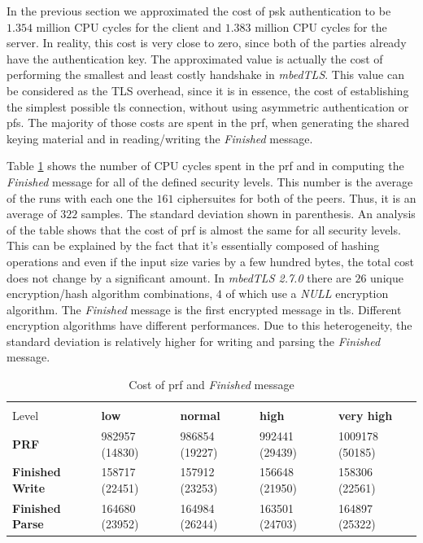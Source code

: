 In the previous section we approximated the cost of \gls{psk} authentication to be $1.354$ million CPU cycles
for the client and $1.383$ million CPU cycles for the server. In reality, this cost is very close to zero, since
both of the parties already have the authentication key. The approximated value is actually the cost of performing the
smallest and least costly handshake in \textit{mbedTLS}.
This value can be considered as the TLS overhead, since it is in essence, the cost of establishing the simplest possible \gls{tls} connection,
without using asymmetric authentication or \gls{pfs}. The majority of those costs are spent in the \gls{prf}, when generating the
shared keying material and in reading/writing the \textit{Finished} message. 

Table \ref{table:hs-key-gen-cost} shows the number of CPU cycles spent in the \gls{prf}
and in computing the \textit{Finished} message for all of the defined security levels.
This number is the average of the runs with each one the $161$ ciphersuites for both of the peers. Thus, it is
an average of $322$ samples. The standard deviation shown in parenthesis.
An analysis of the table shows that the cost of \gls{prf} is almost the same for all security levels. This can be explained by
the fact that it's essentially composed of hashing operations and even if the input size varies
by a few hundred bytes, the total cost does not change by a significant amount.
In \textit{mbedTLS 2.7.0} there are $26$ unique encryption/hash algorithm combinations, $4$ of which use a \textit{NULL} encryption algorithm.
The \textit{Finished} message is the first encrypted message in \gls{tls}. Different encryption algorithms have different
performances. Due to this heterogeneity, the standard deviation is relatively higher for writing and parsing the 
\textit{Finished} message.

\begin{table}[]
\begin{tabular}{|l|l|l|l|l|}
\hline
 \backslashbox{Opeation}{Security\\Level}                       & \textbf{low}   & \textbf{normal} & \textbf{high}  & \textbf{very high} \\ \hline
\textbf{PRF}            & 982957 (14830) & 986854 (19227)  & 992441 (29439) & 1009178 (50185)    \\ \hline
\textbf{Finished Write} & 158717 (22451) & 157912 (23253)  & 156648 (21950) & 158306 (22561)     \\ \hline
\textbf{Finished Parse} & 164680 (23952) & 164984 (26244)  & 163501 (24703) & 164897 (25322)     \\ \hline
\end{tabular}
\centering \caption{\label{table:hs-key-gen-cost} Cost of \gls{prf} and \textit{Finished} message}
\end{table}

